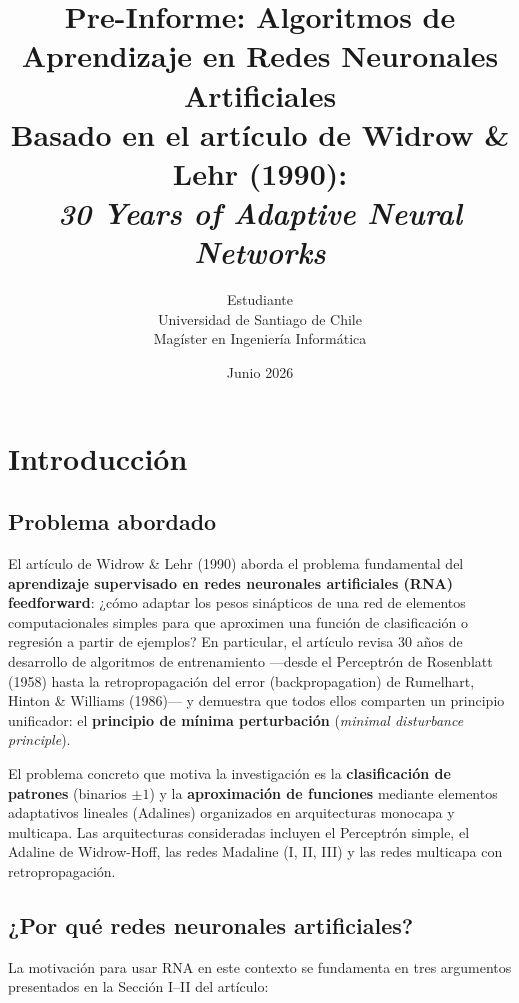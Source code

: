 \documentclass[12pt,a4paper]{article}
\title{\textbf{Pre-Informe: Algoritmos de Aprendizaje en Redes Neuronales Artificiales}\\[4pt]
\large Basado en el artículo de Widrow \& Lehr (1990):\\
\textit{30 Years of Adaptive Neural Networks}}
\author{Estudiante\\Universidad de Santiago de Chile\\Magíster en Ingeniería Informática}
\date{Junio 2026}
\begin{document}
\maketitle

\section{Introducción}

\subsection{Problema abordado}

El artículo de Widrow \& Lehr (1990) aborda el problema fundamental del \textbf{aprendizaje supervisado en redes neuronales artificiales (RNA) feedforward}: ¿cómo adaptar los pesos sinápticos de una red de elementos computacionales simples para que aproximen una función de clasificación o regresión a partir de ejemplos? En particular, el artículo revisa 30 años de desarrollo de algoritmos de entrenamiento —desde el Perceptrón de Rosenblatt (1958) hasta la retropropagación del error (backpropagation) de Rumelhart, Hinton \& Williams (1986)— y demuestra que todos ellos comparten un principio unificador: el \textbf{principio de mínima perturbación} (\textit{minimal disturbance principle}).

El problema concreto que motiva la investigación es la \textbf{clasificación de patrones} (binarios $\pm1$) y la \textbf{aproximación de funciones} mediante elementos adaptativos lineales (Adalines) organizados en arquitecturas monocapa y multicapa. Las arquitecturas consideradas incluyen el Perceptrón simple, el Adaline de Widrow-Hoff, las redes Madaline (I, II, III) y las redes multicapa con retropropagación.

\subsection{¿Por qué redes neuronales artificiales?}

La motivación para usar RNA en este contexto se fundamenta en tres argumentos presentados en la Sección I--II del artículo:
\end{document}
